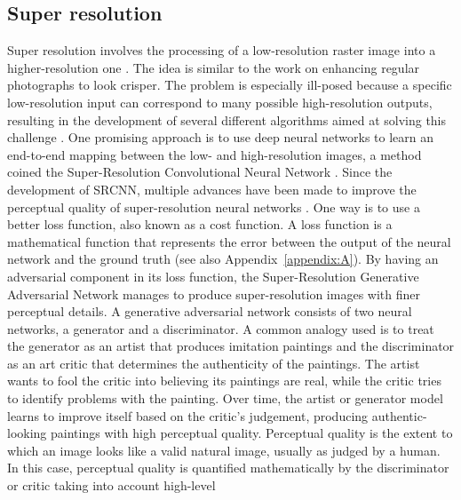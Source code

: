 \documentclass[tc, noline]{copernicus}
\begin{document}
\subsection{Super resolution}\label{section:superresolution}

Super resolution involves the processing of a low-resolution raster image into a higher-resolution one \citep{TsaiMultiframeimagerestoration1984}. The
idea is similar to the work on enhancing regular photographs to look crisper. The problem is especially ill-posed because a specific low-resolution
input can correspond to many possible high-resolution outputs, resulting in the development of several different algorithms aimed at solving this
challenge \citep[see][for a review]{NasrollahiSuperresolutioncomprehensivesurvey2014}. One promising approach is to use deep neural networks
\citep{LeCunDeeplearning2015} to learn an end-to-end mapping between the low- and high-resolution images, a method coined the Super-Resolution
Convolutional Neural Network \citep[SRCNN;][]{DongImageSuperResolutionUsing2014}. Since the development of SRCNN, multiple advances have been made to
improve the perceptual quality of super-resolution neural networks \citep[see][for a review]{YangDeepLearningSingle2019}. One way is to use a better
loss function, also known as a cost function. A loss function is a mathematical function that represents the error between the output of the neural
network and the ground truth (see also Appendix~\ref{appendix:A}). By having an adversarial component in its loss function, the Super-Resolution
Generative Adversarial Network \citep[SRGAN;][]{LedigPhotoRealisticSingleImage2017} manages to produce super-resolution images with finer perceptual
details. A generative adversarial network \citep{GoodfellowGenerativeAdversarialNetworks2014} consists of two neural networks, a generator and a
discriminator. A common analogy used is to treat the generator as an artist that produces imitation paintings and the discriminator as an art critic
that determines the authenticity of the paintings. The artist wants to fool the critic into believing its paintings are real, while the critic tries
to identify problems with the painting. Over time, the artist or generator model learns to improve itself based on the critic's judgement, producing
authentic-looking paintings with high perceptual quality. Perceptual quality is the extent to which an image looks like a valid natural image, usually
as judged by a human. In this case, perceptual quality is quantified mathematically by the discriminator or critic taking into account high-level
\end{document}
